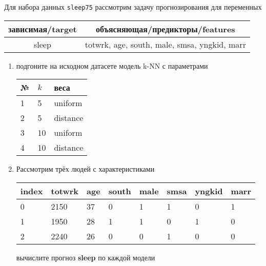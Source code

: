 \begin{exercise}
Для набора данных \texttt{sleep75} рассмотрим задачу прогнозирования
для переменных
\begin{center}
	\begin{tabular}{|c|c|}\hline
		зависимая/target & объясняющая/предикторы/features \\ \hline
		sleep & totwrk, age, south, male, smsa, yngkid, marr \\ \hline
	\end{tabular}
\end{center}
\begin{enumerate}
	\item подгоните на исходном датасете модель k-NN с параметрами
	\begin{center}
		\begin{tabular}{|l|l|l|}\hline
		№ & \(k\) & веса \\ \hline
		1 & 5 & uniform \\
		2 & 5 & distance \\
		3 & 10 & uniform \\
		4 & 10 & distance \\ \hline
		\end{tabular}
	\end{center}
	\item Рассмотрим трёх людей с характеристиками
	\begin{center}
		\begin{tabular}{|l||l|l|l|l|l|l|l|}\hline
			index & totwrk & age & south & male & smsa & yngkid & marr \\ \hline\hline
			0 & 2150 & 37 & 0 & 1 & 1 & 0 & 1 \\
			1 & 1950 & 28 & 1 & 1 & 0 & 1 & 0 \\
			2 & 2240 & 26 & 0 & 0 & 1 & 0 & 0 \\ \hline
		\end{tabular}
	\end{center}
	вычислите прогноз \textbf{sleep} по каждой модели
\end{enumerate}
\end{exercise}

